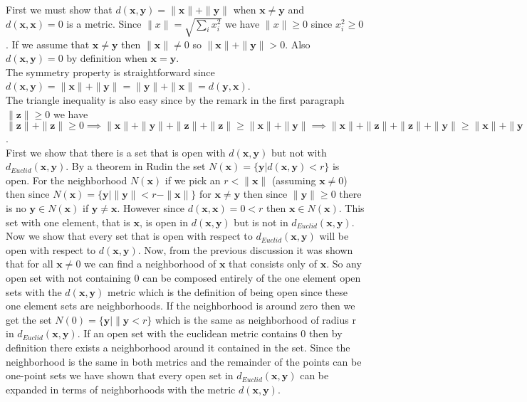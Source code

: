 \documentclass[11pt,reqno]{article}
\begin{document}
First we must show that $d(\mathbf{x},\mathbf{y}) = \| \mathbf{x} \| + \| \mathbf{y} \|$ when $\mathbf{x} \neq \mathbf{y}$ and $d(\mathbf{x},\mathbf{x}) = 0$ is a metric. Since $\|x\| = \sqrt{\sum_i x_i^2}$ we have $\| x \| \ge 0$ since $x_i^2 \ge 0$. If we assume that $\mathbf{x} \neq \mathbf{y}$ then $\|\mathbf{x}\| \neq 0$ so  $\| \mathbf{x} \| + \|  \mathbf{y} \| > 0$. Also $d(\mathbf{x},\mathbf{y}) = 0$ by definition when $\mathbf{x} = \mathbf{y}$.\\
\indent The symmetry property is straightforward since $d(\mathbf{x},\mathbf{y})  =  \| \mathbf{x} \| + \| \mathbf{y} \| =  \| \mathbf{y} \| + \| \mathbf{x} \|  = d(\mathbf{y},\mathbf{x})$.\\
\indent The triangle inequality is also easy since by the remark in the first paragraph $\| \mathbf{z} \| \ge 0$ we have $\| \mathbf{z} \| + \| \mathbf{z} \| \ge 0 \implies \| \mathbf{x} \|  + \| \mathbf{y} \| +  \| \mathbf{z} \| + \| \mathbf{z} \| \ge \|  \mathbf{x} \|  + \| \mathbf{y} \|\implies \| \mathbf{x} \|  + \| \mathbf{z} \| +  \| \mathbf{z} \| + \| \mathbf{y} \| \ge \| \mathbf{x} \|  + \| \mathbf{y} \| \implies d(\mathbf{x},\mathbf{y}) \le d(\mathbf{x},\mathbf{z}) + d(\mathbf{z},\mathbf{x})$.\\
\indent First we show that there is a set that is open with $d(\mathbf{x},\mathbf{y})$ but not with $d_{Euclid}(\mathbf{x},\mathbf{y})$. By a theorem in Rudin the set $N(\mathbf{x}) = \{ \mathbf{y} | d(\mathbf{x},\mathbf{y}) < r \}$ is open. For the neighborhood $N(\mathbf{x})$ if we pick an $r < \| \mathbf{x} \|$ (assuming $\mathbf{x} \neq 0$) then since $N(\mathbf{x}) = \{ \mathbf{y} | \| \mathbf{y} \| < r - \| \mathbf{x} \| \}$ for $\mathbf{x} \neq \mathbf{y}$ then since $\|\mathbf{y}\| \ge 0$ there is no $\mathbf{y} \in N(\mathbf{x})$ if $\mathbf{y} \neq \mathbf{x}$. However since $d(\mathbf{x},\mathbf{x}) = 0 < r$ then $\mathbf{x} \in N(\mathbf{x})$. This set with one element, that is $\mathbf{x}$, is open in $d(\mathbf{x},\mathbf{y})$ but is not in $d_{Euclid}(\mathbf{x},\mathbf{y})$.\\
\indent Now we show that every set that is open with respect to $d_{Euclid}(\mathbf{x},\mathbf{y})$ will be open with respect to $d(\mathbf{x},\mathbf{y})$. Now, from the previous discussion it was shown that for all $\mathbf{x} \neq 0$ we can find a neighborhood of $\mathbf{x}$ that consists only of $\mathbf{x}$. So any open set with not containing $0$ can be composed entirely of the one element open sets with the $d(\mathbf{x},\mathbf{y})$ metric which is the definition of being open since these one element sets are neighborhoods. If the neighborhood is around zero then we get the set $N(0) = \{ \mathbf{y} | \| \mathbf{y} < r \}$ which is the same as neighborhood of radius r in $d_{Euclid}(\mathbf{x},\mathbf{y})$. If an open set with the euclidean metric contains 0 then by definition there exists a neighborhood around it contained in the set. Since the neighborhood is the same in both metrics and the remainder of the points can be one-point sets we have shown that every open set in $d_{Euclid}(\mathbf{x},\mathbf{y})$ can be expanded in terms of neighborhoods with the metric $d(\mathbf{x},\mathbf{y})$.
\end{document}
